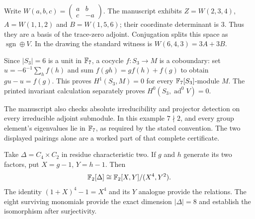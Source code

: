 
Write $W(a,b,c)=\left(\begin{smallmatrix}a&b\\c&-a\end{smallmatrix}\right)$. The manuscript exhibits $Z=W(2,3,4)$, $A=W(1,1,2)$ and $B=W(1,5,6)$; their coordinate determinant is $3$. Thus they are a basis of the trace-zero adjoint. Conjugation splits this space as $\operatorname{sgn}\oplus V$. In the drawing the standard witness is $W(6,4,3)=3A+3B$.

Since $|S_3|=6$ is a unit in $\mathbb F_7$, a cocycle $f:S_3\to M$ is a coboundary: set $u=-6^{-1}\sum_h f(h)$ and sum $f(gh)=g f(h)+f(g)$ to obtain $gu-u=f(g)$. This proves $H^1(S_3,M)=0$ for every $\mathbb F_7[S_3]$-module $M$. The printed invariant calculation separately proves $H^0(S_3,\operatorname{ad}^0V)=0$.

The manuscript also checks absolute irreducibility and projector detection on every irreducible adjoint submodule. In this example $7\nmid2$, and every group element's eigenvalues lie in $\mathbb F_7$, as required by the stated convention. The two displayed pairings alone are a worked part of that complete certificate.


Take $\Delta=C_4\times C_2$ in residue characteristic two. If $g$ and $h$ generate its two factors, put $X=g-1$, $Y=h-1$. Then
\[
\mathbb F_2[\Delta]\cong\mathbb F_2[X,Y]/(X^4,Y^2).
\]
The identity $(1+X)^4-1=X^4$ and its $Y$ analogue provide the relations. The eight surviving monomials provide the exact dimension $|\Delta|=8$ and establish the isomorphism after surjectivity.


